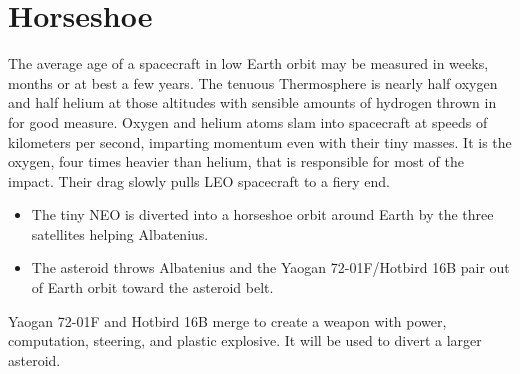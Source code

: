 %
%

\chapter{Horseshoe}

The average age of a spacecraft in low Earth orbit may be measured in weeks, months or at best a few years. The tenuous Thermosphere is nearly half oxygen and half helium at those altitudes with sensible amounts of hydrogen thrown in for good measure. Oxygen and helium atoms slam into spacecraft at speeds of kilometers per second, imparting momentum even with their tiny masses. It is the oxygen, four times heavier than helium, that is responsible for most of the impact. Their drag slowly pulls LEO spacecraft to a fiery end.

\begin{itemize}
\item{The tiny NEO is diverted into a horseshoe orbit around Earth by the three satellites helping Albatenius.}
\item{The asteroid throws Albatenius and the Yaogan 72-01F/Hotbird 16B pair out of Earth orbit toward the asteroid belt.}
\end{itemize}

Yaogan 72-01F and Hotbird 16B merge to create a weapon with power, computation, steering, and plastic explosive. It will be used to divert a larger asteroid.

\newpage
\thispagestyle{empty}
